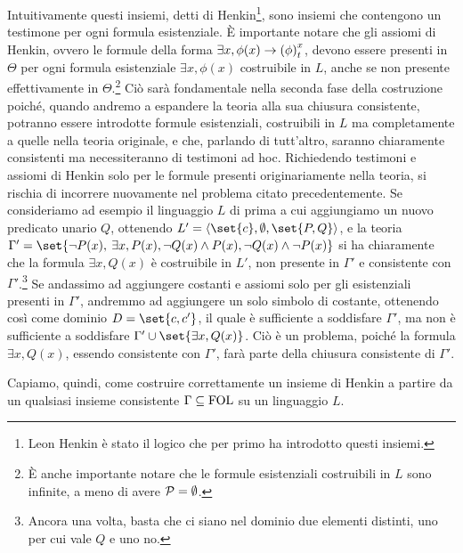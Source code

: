 Intuitivamente questi insiemi, detti di Henkin\footnote{Leon Henkin è stato il logico che per primo ha introdotto questi insiemi.}, sono insiemi che contengono un testimone per ogni formula esistenziale. È importante notare che gli assiomi di Henkin, ovvero le formule della forma \(\exists x, \phi(x) \to {{\left(\phi\right)}^{x}_{t}}\), devono essere presenti in \(\Theta\) per ogni formula esistenziale \(\exists x, \phi(x)\) costruibile in \(L\), anche se non presente effettivamente in \(\Theta\).\footnote{È anche importante notare che le formule esistenziali costruibili in \(L\) sono infinite, a meno di avere \(\mathcal{P} = \emptyset\).} Ciò sarà fondamentale nella seconda fase della costruzione poiché, quando andremo a espandere la teoria alla sua chiusura consistente, potranno essere introdotte formule esistenziali, costruibili in \(L\) ma completamente  a quelle nella teoria originale, e che, parlando di tutt'altro, saranno chiaramente consistenti ma necessiteranno di testimoni ad hoc. Richiedendo testimoni e assiomi di Henkin solo per le formule presenti originariamente nella teoria, si rischia di incorrere nuovamente nel problema citato precedentemente. Se consideriamo ad esempio il linguaggio \(L\) di prima a cui aggiungiamo un nuovo predicato unario \(Q\), ottenendo \(L' = \langle \set{c}, \emptyset, \set{P,Q}\rangle\), e la teoria \(\Gamma' = \set{\neg P(x),\: \exists x, P(x), \neg Q(x) \land P(x), \neg Q(x) \land \neg P(x)}\) si ha chiaramente che la formula \(\exists x, Q(x)\) è costruibile in \(L'\), non presente in \(\Gamma'\) e consistente con \(\Gamma'\).\footnote{Ancora una volta, basta che ci siano nel dominio due elementi distinti, uno per cui vale \(Q\) e uno no.} Se andassimo ad aggiungere costanti e assiomi solo per gli esistenziali presenti in \(\Gamma'\), andremmo ad aggiungere un solo simbolo di costante, ottenendo così come dominio \(D=\set{c,c'}\), il quale è sufficiente a soddisfare \(\Gamma'\), ma non è sufficiente a soddisfare \(\Gamma' \cup \set{\exists x, Q(x)}\). Ciò è un problema, poiché la formula \(\exists x, Q(x)\), essendo consistente con \(\Gamma'\), farà parte della chiusura consistente di \(\Gamma'\).

Capiamo, quindi, come costruire correttamente un insieme di Henkin a partire da un qualsiasi insieme consistente \(\Gamma\subseteq\FOL\) su un linguaggio \(L\).

